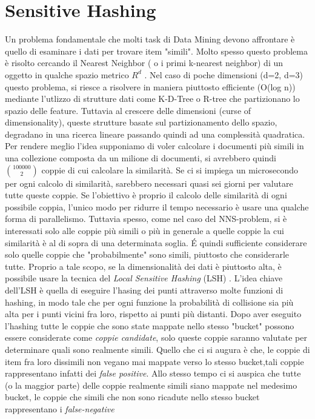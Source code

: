 \documentclass[a4paper,12pt]{report}
\begin{document}
\section{Sensitive Hashing}
Un problema fondamentale che molti task di Data Mining devono affrontare è quello di esaminare i dati per trovare item "simili". Molto spesso questo problema è risolto cercando il Nearest Neighbor ( o i primi k-nearest neighbor) di un oggetto in qualche spazio metrico $R^d$ .
Nel caso di poche dimensioni (d=2, d=3) questo problema, si riesce a risolvere in maniera piuttosto efficiente (O(log n)) mediante l'utlizzo di strutture dati come K-D-Tree o R-tree che partizionano lo spazio delle feature. Tuttavia al crescere delle dimensioni (curse of dimensionality), queste strutture basate sul partizionamento dello spazio, degradano in una ricerca lineare \cite{Weber:1998:QAP:645924.671192} passando quindi ad una complessità quadratica.
Per rendere meglio l'idea supponiamo di voler calcolare i documenti più simili in una collezione composta da un milione di documenti, si avrebbero quindi  $\binom{100000}{2}$  coppie di cui calcolare la similarità. Se ci si impiega un microsecondo per ogni calcolo di similarità, sarebbero necessari quasi sei giorni per valutare tutte queste coppie.
Se l'obiettivo è proprio il calcolo delle similarità di ogni possibile coppia, l'unico modo per ridurre il tempo necessario è usare una qualche forma di parallelismo. Tuttavia spesso, come nel caso del NNS-problem, si è interessati solo alle coppie più simili o più in generale a quelle coppie la cui similarità è al di sopra di una determinata soglia. \'E quindi sufficiente considerare solo quelle coppie che "probabilmente" sono simili, piuttosto che considerarle tutte. Proprio a tale scopo, se la dimensionalità dei dati è piuttosto alta, è possibile usare la tecnica del \emph{Local Sensitive Hashing} (LSH) \cite{Lsh} \cite{Gionis:1999}. L'idea chiave dell'LSH è quella di eseguire l'hasing dei punti attraverso molte funzioni di hashing, in modo tale che per ogni funzione la probabilità di collisione sia più alta per i punti vicini fra loro, rispetto ai punti più distanti.
Dopo aver eseguito l'hashing  tutte le coppie che sono state mappate nello stesso "bucket" possono essere considerate come \emph{coppie candidate}, solo queste coppie saranno valutate per determinare quali sono realmente simili. Quello che ci si augura è che, le coppie di item fra loro dissimili non vegano mai mappate verso lo stesso bucket,tali coppie rappresentano infatti dei \emph{false positive}. Allo stesso tempo ci si auspica che tutte (o la maggior parte) delle coppie realmente simili siano mappate nel medesimo bucket, le coppie che simili che non sono ricadute nello stesso bucket rappresentano i \emph{false-negative}
\end{document}

